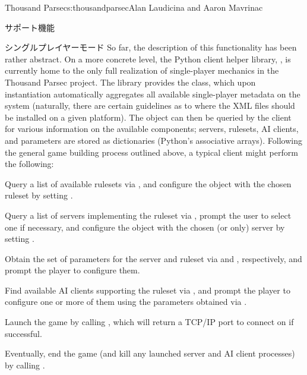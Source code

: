\begin{aosachapter}{Thousand Parsec}{s:thousandparsec}{Alan Laudicina and Aaron Mavrinac}
\begin{aosasect1}{サポート機能}
\begin{aosasect2}{シングルプレイヤーモード}
So far, the description of this functionality has been rather
abstract. On a more concrete level, the Python client helper library,
, is currently home to the only full realization
of single-player mechanics in the Thousand Parsec project. The library
provides the  class, which upon instantiation
automatically aggregates all available single-player metadata on the
system (naturally, there are certain guidelines as to where the XML
files should be installed on a given platform). The object can then be
queried by the client for various information on the available
components; servers, rulesets, AI clients, and parameters are stored
as dictionaries (Python's associative arrays). Following the general
game building process outlined above, a typical client might perform
the following:

\begin{aosaenumerate}

  \item Query a list of available rulesets via
  , and configure the object with
  the chosen ruleset by setting .

  \item Query a list of servers implementing the ruleset via
  , prompt the
  user to select one if necessary, and configure the object with the
  chosen (or only) server by setting .

  \item Obtain the set of parameters for the server and ruleset via
   and
  , respectively, and prompt
  the player to configure them.

  \item Find available AI clients supporting the ruleset
  via , and
  prompt the player to configure one or more of them using the
  parameters obtained via .

  \item Launch the game by calling ,
  which will return a TCP/IP port to connect on if successful.

  \item Eventually, end the game (and kill any launched server and AI
  client processes) by calling .


\end{aosaenumerate}
\end{aosasect2}
\end{aosasect1}
\end{aosachapter}
